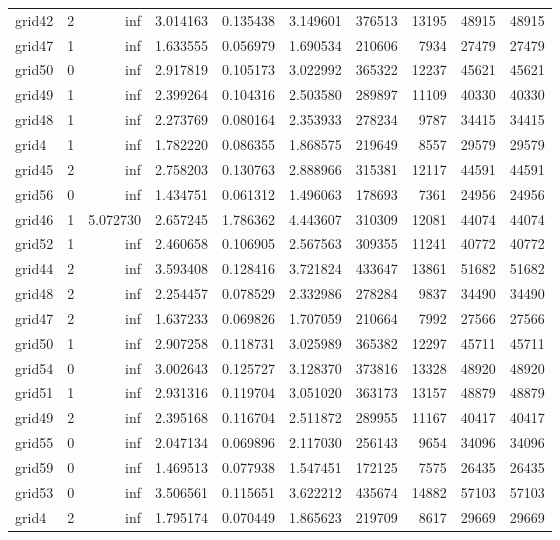 \begin{longtable}{|l|r|r|r|r|r|r|r|r|r|}
grid42 & 2 & inf & 3.014163 & 0.135438 & 3.149601 & 376513 & 13195 & 48915 & 48915 \\
grid47 & 1 & inf & 1.633555 & 0.056979 & 1.690534 & 210606 & 7934 & 27479 & 27479 \\
grid50 & 0 & inf & 2.917819 & 0.105173 & 3.022992 & 365322 & 12237 & 45621 & 45621 \\
grid49 & 1 & inf & 2.399264 & 0.104316 & 2.503580 & 289897 & 11109 & 40330 & 40330 \\
grid48 & 1 & inf & 2.273769 & 0.080164 & 2.353933 & 278234 & 9787 & 34415 & 34415 \\
grid4 & 1 & inf & 1.782220 & 0.086355 & 1.868575 & 219649 & 8557 & 29579 & 29579 \\
grid45 & 2 & inf & 2.758203 & 0.130763 & 2.888966 & 315381 & 12117 & 44591 & 44591 \\
grid56 & 0 & inf & 1.434751 & 0.061312 & 1.496063 & 178693 & 7361 & 24956 & 24956 \\
grid46 & 1 & 5.072730 & 2.657245 & 1.786362 & 4.443607 & 310309 & 12081 & 44074 & 44074 \\
grid52 & 1 & inf & 2.460658 & 0.106905 & 2.567563 & 309355 & 11241 & 40772 & 40772 \\
grid44 & 2 & inf & 3.593408 & 0.128416 & 3.721824 & 433647 & 13861 & 51682 & 51682 \\
grid48 & 2 & inf & 2.254457 & 0.078529 & 2.332986 & 278284 & 9837 & 34490 & 34490 \\
grid47 & 2 & inf & 1.637233 & 0.069826 & 1.707059 & 210664 & 7992 & 27566 & 27566 \\
grid50 & 1 & inf & 2.907258 & 0.118731 & 3.025989 & 365382 & 12297 & 45711 & 45711 \\
grid54 & 0 & inf & 3.002643 & 0.125727 & 3.128370 & 373816 & 13328 & 48920 & 48920 \\
grid51 & 1 & inf & 2.931316 & 0.119704 & 3.051020 & 363173 & 13157 & 48879 & 48879 \\
grid49 & 2 & inf & 2.395168 & 0.116704 & 2.511872 & 289955 & 11167 & 40417 & 40417 \\
grid55 & 0 & inf & 2.047134 & 0.069896 & 2.117030 & 256143 & 9654 & 34096 & 34096 \\
grid59 & 0 & inf & 1.469513 & 0.077938 & 1.547451 & 172125 & 7575 & 26435 & 26435 \\
grid53 & 0 & inf & 3.506561 & 0.115651 & 3.622212 & 435674 & 14882 & 57103 & 57103 \\
grid4 & 2 & inf & 1.795174 & 0.070449 & 1.865623 & 219709 & 8617 & 29669 & 29669 \\

\end{longtable}
